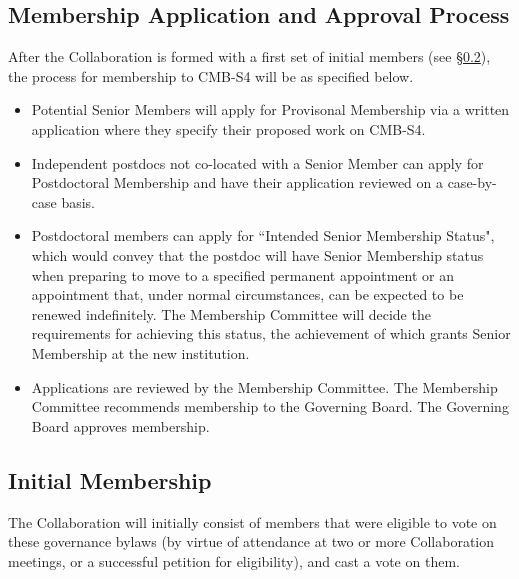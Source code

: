 \documentclass[12pt]{article}
\begin{document}
\subsection{Membership Application and Approval Process}
After the Collaboration is formed with a first set of initial members (see \S\ref{sec:initmembership}), the process for membership to CMB-S4 will be as specified below.

\begin{itemize}

\item Potential Senior Members will apply for Provisonal Membership via a written application where they specify their proposed work on CMB-S4. 

\item Independent postdocs not co-located with a Senior Member can apply for Postdoctoral Membership and have their application reviewed on a case-by-case basis. 

\item Postdoctoral members can apply for ``Intended Senior Membership Status", which would convey that the postdoc will have Senior Membership status when preparing to move to a specified permanent appointment or an appointment that, under normal circumstances, can be expected to be renewed indefinitely.  The Membership Committee will decide the requirements for achieving this status, the achievement of which grants Senior Membership at the new institution.

\item Applications are reviewed by the Membership Committee. The Membership Committee recommends membership to the Governing Board.  The Governing Board approves membership.

\end{itemize}

\subsection{Initial Membership}
\label{sec:initmembership}
The Collaboration will initially consist of members that were eligible to vote on these governance bylaws (by virtue of attendance at two or more Collaboration meetings, or a successful petition for eligibility), and cast a vote on them. 

%
%
\end{document}
